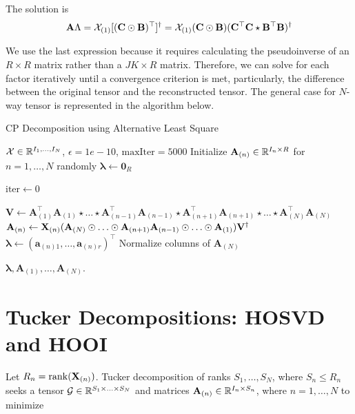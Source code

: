 The solution is
\begin{equation}
    \mathbf{A}\Lambda = \mathcal{X}_{(1)}[(\mathbf{C}\odot \mathbf{B})^\top]^\dag = \mathcal{X}_{(1)}(\mathbf{C}\odot \mathbf{B})(\mathbf{C}^\top \mathbf{C}\star \mathbf{B}^\top\mathbf{B})^\dag
\end{equation}

We use the last expression because it requires calculating the pseudoinverse of an $R\times R$ matrix rather than a $JK\times R$ matrix. Therefore, we can solve for each factor iteratively until a convergence criterion is met, particularly, the difference between the original tensor and the reconstructed tensor. The general case for $N$-way tensor is represented in the algorithm below.

\begin{algorithm}
    \caption{CP Decomposition using Alternative Least Square}
    \label{alg:cap}
    \begin{algorithmic}
        \Require $\mathcal{X}\in{\mathbb{R}}^{I_1,\ldots, I_N}$, $\epsilon = 1e-10$, $\text{maxIter} = 5000$
        \State Initialize $\mathbf{A}_{(n)}\in{\mathbb{R}}^{I_n\times R}$ for $n=1,\ldots, N$ randomly
        \State $\bm{\lambda} \gets \mathbf{0}_R$

        \State $\text{iter} \gets 0$


        \State $\mathbf{V}\gets \mathbf{A}_{(1)}^\top \mathbf{A}_{(1)} \star \ldots \star \mathbf{A}_{(n-1)}^\top \mathbf{A}_{(n-1)} \star \mathbf{A}_{(n+1)}^\top \mathbf{A}_{(n+1)}\star\ldots\star \mathbf{A}_{(N)}^\top \mathbf{A}_{(N)}$
        \State $\mathbf{A}_{(n)} \gets \mathbf{X}_{(n)} (\mathbf{A}_{(N)}\odot\ldots\odot \mathbf{A}_{(n+1)}\mathbf{A}_{(n-1)} \odot\ldots\odot \mathbf{A}_{(1)})\mathbf{V}^\dag$
        \State $\bm{\lambda} \gets (\mathbf{a}_{(n)1}, \dots, \mathbf{a}_{(n)r})^\top$
        \State Normalize columns of $\mathbf{A}_{(N)}$
        \EndFor

        \EndWhile
        \Ensure $\bm{\lambda}, \mathbf{A}_{(1)},\ldots,\mathbf{A}_{(N)}$.
    \end{algorithmic}
\end{algorithm}

\section{Tucker Decompositions: HOSVD and HOOI}
Let $R_n=\mathrm{rank}(\mathbf{X}_{(n)})$. Tucker decomposition of ranks $S_1,\ldots,S_N$, where $S_n\le R_n$ seeks a tensor $\mathcal{G}\in{\mathbb{R}}^{S_1\times\ldots\times S_N}$ and matrices $\mathbf{A}_{(n)}\in{\mathbb{R}}^{I_n \times S_n}$, where $n=1,\ldots, N$ to minimize


